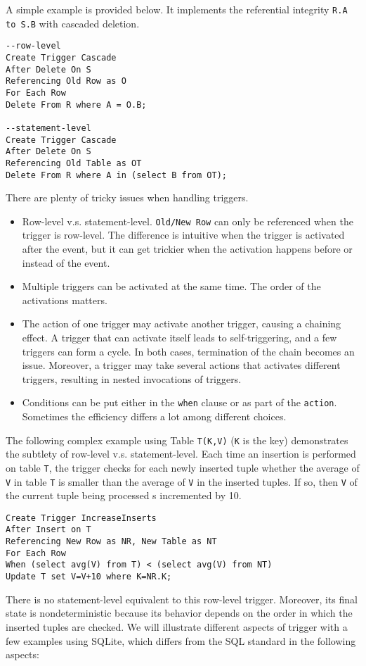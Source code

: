 A simple example is provided below. It implements the referential integrity \texttt{R.A to S.B} with cascaded deletion.
\begin{lstlisting}
--row-level
Create Trigger Cascade
After Delete On S
Referencing Old Row as O
For Each Row
Delete From R where A = O.B;

--statement-level
Create Trigger Cascade
After Delete On S
Referencing Old Table as OT
Delete From R where A in (select B from OT);
\end{lstlisting}
There are plenty of tricky issues when handling triggers.
\begin{itemize}
\item Row-level v.s. statement-level. \texttt{Old/New Row} can only be referenced when the trigger is row-level. The difference is intuitive when the trigger is activated after the event, but it can get trickier when the activation happens before or instead of the event. 
\item Multiple triggers can be activated at the same time. The order of the activations matters.
\item The action of one trigger may activate another trigger, causing a chaining effect. A trigger that can activate itself leads to self-triggering, and a few triggers can form a cycle. In both cases, termination of the chain becomes an issue. Moreover, a trigger may take several actions that activates different triggers, resulting in nested invocations of triggers. 
\item Conditions can be put either in the \texttt{when} clause or as part of the \texttt{action}. Sometimes the efficiency differs a lot among different choices. 
\end{itemize}
The following complex example using Table \texttt{T(K,V)} (\texttt{K} is the key) demonstrates the subtlety of row-level v.s. statement-level. Each time an insertion is performed on table \texttt{T}, the trigger checks for each newly inserted tuple whether the average of \texttt{V} in table \texttt{T} is smaller than the average of \texttt{V} in the inserted tuples. If so, then \texttt{V} of the current tuple being processed s incremented by 10.
\begin{lstlisting}
Create Trigger IncreaseInserts
After Insert on T
Referencing New Row as NR, New Table as NT
For Each Row
When (select avg(V) from T) < (select avg(V) from NT)
Update T set V=V+10 where K=NR.K;
\end{lstlisting}
There is no statement-level equivalent to this row-level trigger. Moreover, its final state is nondeterministic because its behavior depends on the order in which the inserted tuples are checked. We will illustrate different aspects of trigger with a few examples using SQLite, which differs from the SQL standard in the following aspects:
